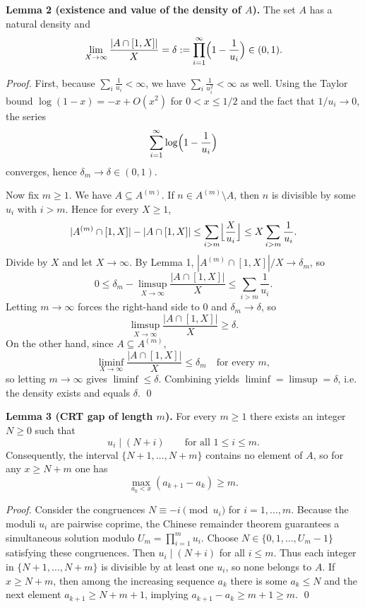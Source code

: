 \medskip
\noindent\textbf{Lemma 2 (existence and value of the density of $A$).}
The set $A$ has a natural density and
\[\lim_{X\to\infty}\frac{|A\cap[1,X]|}{X}=\delta:=\prod_{i=1}^{\infty}\Bigl(1-\frac{1}{u_i}\Bigr)\in(0,1).
\]

\noindent\emph{Proof.}
First, because $\sum_i \frac1{u_i}<\infty$, we have $\sum_i \frac1{u_i^2}<\infty$ as well.
Using the Taylor bound $\log(1-x)=-x+O(x^2)$ for $0<x\le 1/2$ and the fact that $1/u_i\to 0$, the series
\[\sum_{i=1}^{\infty}\log\Bigl(1-\frac1{u_i}\Bigr)
\]
converges, hence $\delta_m\to\delta\in(0,1)$.

Now fix $m\ge 1$. We have $A\subseteq A^{(m)}$.
If $n\in A^{(m)}\setminus A$, then $n$ is divisible by some $u_i$ with $i>m$.
Hence for every $X\ge 1$,
\[
|A^{(m)}\cap[1,X]|-|A\cap[1,X]|\le \sum_{i>m}\Bigl\lfloor\frac{X}{u_i}\Bigr\rfloor\le X\sum_{i>m}\frac1{u_i}.
\]
Divide by $X$ and let $X\to\infty$. By Lemma 1, $|A^{(m)}\cap[1,X]|/X\to\delta_m$, so
\[
0\le \delta_m-\limsup_{X\to\infty}\frac{|A\cap[1,X]|}{X} \le \sum_{i>m}\frac1{u_i}.
\]
Letting $m\to\infty$ forces the right-hand side to $0$ and $\delta_m\to\delta$, so
\[\limsup_{X\to\infty}\frac{|A\cap[1,X]|}{X}\ge \delta.
\]
On the other hand, since $A\subseteq A^{(m)}$,
\[\liminf_{X\to\infty}\frac{|A\cap[1,X]|}{X}\le \delta_m\quad\text{for every }m,
\]
so letting $m\to\infty$ gives $\liminf\le \delta$.
Combining yields $\liminf=\limsup=\delta$, i.e. the density exists and equals $\delta$. \qed

\medskip
\noindent\textbf{Lemma 3 (CRT gap of length $m$).}
For every $m\ge 1$ there exists an integer $N\ge 0$ such that
\[u_i\mid (N+i)\qquad\text{for all }1\le i\le m.
\]
Consequently, the interval $\{N+1,\dots,N+m\}$ contains no element of $A$, so for any $x\ge N+m$ one has
\[\max_{a_k<x}(a_{k+1}-a_k)\ge m.
\]

\noindent\emph{Proof.}
Consider the congruences $N\equiv -i\pmod{u_i}$ for $i=1,\dots,m$.
Because the moduli $u_i$ are pairwise coprime, the Chinese remainder theorem guarantees a simultaneous solution modulo $U_m=\prod_{i=1}^m u_i$.
Choose $N\in\{0,1,\dots,U_m-1\}$ satisfying these congruences.
Then $u_i\mid(N+i)$ for all $i\le m$.
Thus each integer in $\{N+1,\dots,N+m\}$ is divisible by at least one $u_i$, so none belongs to $A$.
If $x\ge N+m$, then among the increasing sequence $a_k$ there is some $a_{k}\le N$ and the next element $a_{k+1}\ge N+m+1$, implying $a_{k+1}-a_k\ge m+1\ge m$. \qed

